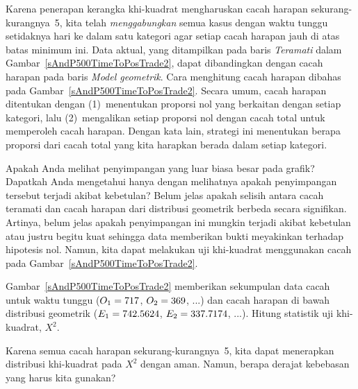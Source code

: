 Karena penerapan kerangka khi-kuadrat mengharuskan cacah harapan
sekurang-kurangnya~5, kita telah \emph{menggabungkan} semua kasus
dengan waktu tunggu setidaknya \spdaysN{} hari ke dalam satu kategori agar setiap
cacah harapan jauh di atas batas minimum ini.
Data aktual, yang ditampilkan pada baris \emph{Teramati} dalam
Gambar~\ref{sAndP500TimeToPosTrade2}, dapat dibandingkan dengan
cacah harapan pada baris \emph{Model geometrik}.
Cara menghitung cacah harapan dibahas pada
Gambar~\ref{sAndP500TimeToPosTrade2}.
Secara umum, cacah harapan ditentukan dengan
(1)~menentukan proporsi nol yang berkaitan dengan setiap kategori,
lalu (2)~mengalikan setiap proporsi nol dengan cacah total
untuk memperoleh cacah harapan.
Dengan kata lain, strategi ini menentukan berapa proporsi dari cacah total
yang kita harapkan berada dalam setiap kategori.

\begin{examplewrap}
\begin{nexample}{Apakah Anda melihat penyimpangan yang luar biasa besar
    pada grafik?
    Dapatkah Anda mengetahui hanya dengan melihatnya apakah penyimpangan tersebut
    terjadi akibat kebetulan?}
  Belum jelas apakah selisih antara cacah teramati
  dan cacah harapan dari distribusi geometrik
  berbeda secara signifikan.
  Artinya, belum jelas apakah penyimpangan ini mungkin
  terjadi akibat kebetulan atau justru begitu kuat sehingga data
  memberikan bukti meyakinkan terhadap hipotesis nol.
  Namun, kita dapat melakukan uji khi-kuadrat menggunakan cacah
  pada Gambar~\ref{sAndP500TimeToPosTrade2}.
\end{nexample}
\end{examplewrap}

\begin{exercisewrap}
\begin{nexercise}
Gambar~\ref{sAndP500TimeToPosTrade2}
memberikan sekumpulan data cacah untuk waktu tunggu
($O_1=717{}$, $O_2=369{}$, ...)
dan cacah harapan di bawah distribusi geometrik
($E_1=742.5624{}$, $E_2=337.7174{}$, ...).
Hitung statistik uji khi-kuadrat, $X^2$.\footnotemark
\end{nexercise}
\end{exercisewrap}

\begin{exercisewrap}
\begin{nexercise}
Karena semua cacah harapan sekurang-kurangnya~5,
kita dapat menerapkan distribusi khi-kuadrat pada $X^2$ dengan aman.
Namun, berapa derajat kebebasan yang harus
kita gunakan?\footnotemark{}
\end{nexercise}
\end{exercisewrap}

